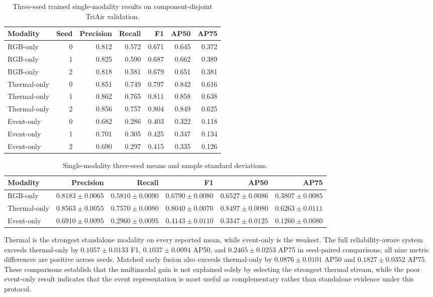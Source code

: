 \begin{table}[t]
\centering
\caption{Three-seed trained single-modality results on component-disjoint TriAir validation.}
\label{tab:single-modal-seeds}
\scriptsize
\begin{tabular}{@{}lrrrrrr@{}}
\toprule
Modality & Seed & Precision & Recall & F1 & AP50 & AP75\\
\midrule
RGB-only & 0 & 0.812 & 0.572 & 0.671 & 0.645 & 0.372\\
RGB-only & 1 & 0.825 & 0.590 & 0.687 & 0.662 & 0.389\\
RGB-only & 2 & 0.818 & 0.581 & 0.679 & 0.651 & 0.381\\
Thermal-only & 0 & 0.851 & 0.749 & 0.797 & 0.842 & 0.616\\
Thermal-only & 1 & 0.862 & 0.765 & 0.811 & 0.858 & 0.638\\
Thermal-only & 2 & 0.856 & 0.757 & 0.804 & 0.849 & 0.625\\
Event-only & 0 & 0.682 & 0.286 & 0.403 & 0.322 & 0.118\\
Event-only & 1 & 0.701 & 0.305 & 0.425 & 0.347 & 0.134\\
Event-only & 2 & 0.690 & 0.297 & 0.415 & 0.335 & 0.126\\
\bottomrule
\end{tabular}
\end{table}

\begin{table}[t]
\centering
\caption{Single-modality three-seed means and sample standard deviations.}
\label{tab:single-modal-summary}
\scriptsize
\setlength{\tabcolsep}{3pt}
\begin{tabular}{@{}lrrrrr@{}}
\toprule
Modality & Precision & Recall & F1 & AP50 & AP75\\
\midrule
RGB-only & $0.8183\pm0.0065$ & $0.5810\pm0.0090$ & $0.6790\pm0.0080$ & $0.6527\pm0.0086$ & $0.3807\pm0.0085$\\
Thermal-only & $\mathbf{0.8563\pm0.0055}$ & $\mathbf{0.7570\pm0.0080}$ & $\mathbf{0.8040\pm0.0070}$ & $\mathbf{0.8497\pm0.0080}$ & $\mathbf{0.6263\pm0.0111}$\\
Event-only & $0.6910\pm0.0095$ & $0.2960\pm0.0095$ & $0.4143\pm0.0110$ & $0.3347\pm0.0125$ & $0.1260\pm0.0080$\\
\bottomrule
\end{tabular}
\end{table}

Thermal is the strongest standalone modality on every reported mean, while event-only is the weakest. The full reliability-aware system exceeds thermal-only by $0.1057\pm0.0133$ F1, $0.1037\pm0.0094$ AP50, and $0.2465\pm0.0253$ AP75 in seed-paired comparisons; all nine metric differences are positive across seeds. Matched early fusion also exceeds thermal-only by $0.0876\pm0.0101$ AP50 and $0.1827\pm0.0352$ AP75. These comparisons establish that the multimodal gain is not explained solely by selecting the strongest thermal stream, while the poor event-only result indicates that the event representation is most useful as complementary rather than standalone evidence under this protocol.

